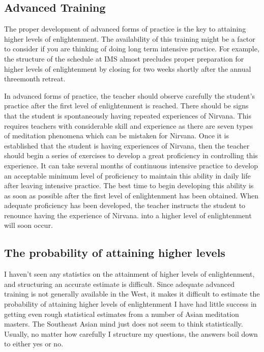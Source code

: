 \documentclass[a5paper,10pt,english]{book}
\begin{document}
\subsection{Advanced Training}
\label{\detokenize{saints:advanced-training}}
\sphinxAtStartPar
The proper development of advanced forms of practice is the key to
attaining higher levels of enlightenment. The availability of this
training might be a factor to consider if you are thinking of doing long
term intensive practice. For example, the structure of the schedule at
IMS almost precludes proper preparation for higher levels of
enlightenment by closing for two weeks shortly after the annual
three\sphinxhyphen{}month retreat.

\sphinxAtStartPar
In advanced forms of practice, the teacher should observe carefully the
student’s practice after the first level of enlightenment is reached.
There should be signs that the student is spontaneously having repeated
experiences of Nirvana. This requires teachers with considerable skill
and experience as there are seven types of meditation phenomena which
can be mistaken for Nirvana. Once it is established that the student is
having experiences of Nirvana, then the teacher should begin a series of
exercises to develop a great proficiency in controlling this experience.
It can take several months of continuous intensive practice to develop
an acceptable minimum level of proficiency to maintain this ability in
daily life after leaving intensive practice. The best time to begin
developing this ability is as soon as possible after the first level of
enlightenment has been obtained. When adequate proficiency has been
developed, the teacher instructs the student to renounce having the
experience of Nirvana.  into a higher level of
enlightenment will soon occur.


\subsection{The probability of attaining higher levels}
\label{\detokenize{saints:the-probability-of-attaining-higher-levels}}
\sphinxAtStartPar
I haven’t seen any statistics on the attainment of higher levels of
enlightenment, and structuring an accurate estimate is difficult. Since
adequate advanced training is not generally available in the West, it
makes it difficult to estimate the probability of attaining higher
levels of enlightenment I have had little success in getting even rough
statistical estimates from a number of Asian meditation masters. The
Southeast Asian mind just does not seem to think statistically. Usually,
no matter how carefully I structure my questions, the answers boil down
to either yes or no.
\end{document}

